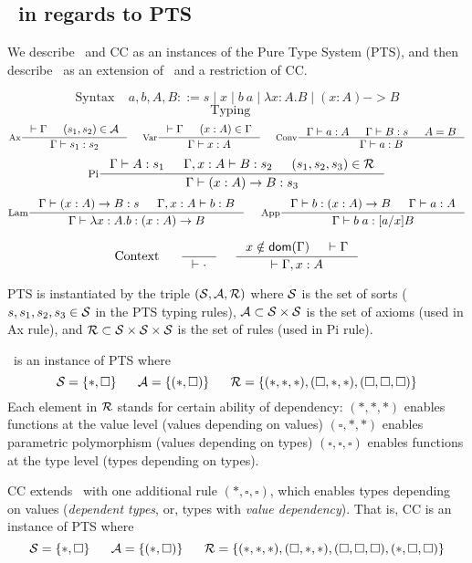 \subsection{\Fi\ in regards to PTS}
We describe \Fw\ and CC as an instances of the Pure Type System (PTS),
and then describe \Fi\ as an extension of \Fw\ and a restriction of CC.

\[\text{Syntax}~~~~~ a,b,A,B ::= s \mid x \mid b~a \mid \lambda x:A.B
                                   \mid (x:A) -> B \]
\[\text{Typing}~~~~~\]
\[
 \inference[Ax]{|-\Gamma & (s_1,s_2)\in\calA}{\Gamma |- s_1 : s_2}
 ~~~~
 \inference[Var]{|-\Gamma & (x:A)\in\Gamma}{\Gamma |- x:A} 
 ~~~~
 \inference[Conv]{\Gamma |- a:A & \Gamma |- B:s & A=B}{\Gamma |- a:B}
\]
\[
 \inference[Pi]{\Gamma |- A:s_1 & \Gamma,x:A |- B:s_2 & (s_1,s_2,s_3)\in\calR}
               {\Gamma |- (x:A)-> B : s_3}
\]
\[
 \inference[Lam]{\Gamma |- (x:A)-> B : s & \Gamma,x:A |- b:B}
                {\Gamma |- \lambda x:A.b : (x:A)-> B}
 ~~~~
 \inference[App]{\Gamma |- b:(x:A)-> B & \Gamma |- a:A}{\Gamma |- b\;a:[a/x]B}
\]

\[\text{Context}~~~~~
 \inference{}{|-\cdot}
 ~~~~
 \inference{x\notin\dom(\Gamma) & |-\Gamma}{|-\Gamma,x:A}
\]

PTS is instantiated by the triple $(\mathcal{S},\mathcal{A},\mathcal{R})$ where
$\mathcal{S}$ is the set of sorts ($s,s_1,s_2,s_3\in\mathcal{S}$ in the PTS typing rules),
$\mathcal{A}\subset\mathcal{S}\times\mathcal{S}$ is the set of axioms (used in Ax rule), and
$\mathcal{R}\subset\mathcal{S}\times\mathcal{S}\times\mathcal{S}$ is the set of rules (used in Pi rule).

\Fw\ is an instance of PTS where
\[\mathcal{S}=\{*,\square\}
  ~~~~~
  \mathcal{A}=\{(*,\square)\}
  ~~~~~
  \mathcal{R}=\{(*,*,*),(\square,*,*),(\square,\square,\square)\}
\]
Each element in $\mathcal{R}$ stands for certain ability of dependency:
$(*,*,*)$ enables functions at the value level
(values depending on values)
$(\square,*,*)$ enables parametric polymorphism
(values depending on types)
$(\square,\square,\square)$ enables functions at the type level
(types depending on types).

CC extends \Fw\ with one additional rule
$(*,\square,\square)$, which enables types depending on values
(\emph{dependent types}, or, types with \emph{value dependency}).
That is, CC is an instance of PTS where
\[\mathcal{S}=\{*,\square\}
  ~~~~~
  \mathcal{A}=\{(*,\square)\}
  ~~~~~
  \mathcal{R}=\{(*,*,*),(\square,*,*),(\square,\square,\square)
         ,(*,\square,\square)\}\]

